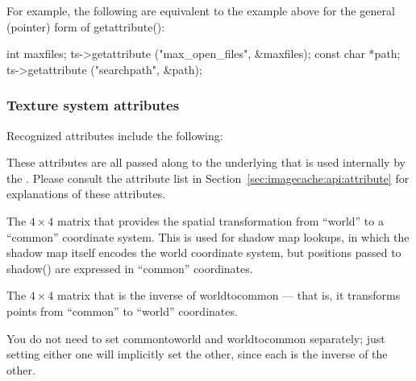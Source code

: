 For example, the following are equivalent to the example above for the
general (pointer) form of {\cf getattribute()}:

\begin{code}
      int maxfiles;
      ts->getattribute ("max_open_files", &maxfiles);
      const char *path;
      ts->getattribute ("searchpath", &path);
\end{code}

\apiend


\subsubsection*{Texture system attributes}
\label{sec:texturesys:attributes}

Recognized attributes include the following:


These attributes are all passed along to the underlying \ImageCache that
is used internally by the \TextureSystem.  Please consult the
\ImageCache attribute list in Section~\ref{sec:imagecache:api:attribute}
for explanations of these attributes.

\apiend

The $4 \times 4$ matrix that provides the spatial transformation
from ``world'' to a ``common'' coordinate system.  This is used for
shadow map lookups, in which the shadow map itself encodes the
world coordinate system, but positions passed to {\cf shadow()} are
expressed in ``common'' coordinates.
\apiend

The $4 \times 4$ matrix that is the inverse of {\cf worldtocommon} ---
that is, it transforms points from ``common'' to ``world'' coordinates.

You do not need to set {\cf commontoworld} and {\cf worldtocommon}
separately; just setting either one will implicitly set the other, since
each is the inverse of the other.
\apiend

